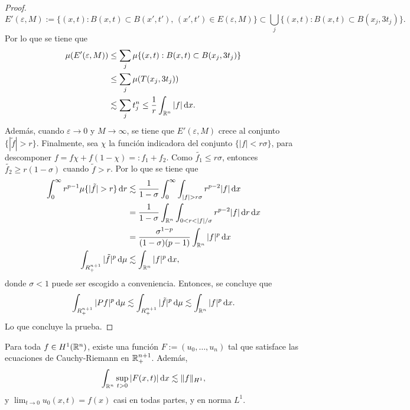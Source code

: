 \begin{proof}
	\begin{equation*}
		E'(\varepsilon, M) := \{(x, t) : B(x, t) \subset B(x', t'), \, (x', t') \in E(\varepsilon, M)\} \subset \bigcup_j \{(x, t): B(x, t)\subset B(x_j, 3t_j)\}.
	\end{equation*}
	Por lo que se tiene que 
	\begin{align*}
		\mu (E'(\varepsilon, M) ) & \leq \sum_j \mu \{(x, t): B(x, t)\subset B(x_j, 3t_j)\} \\
		& \leq \sum_j \mu (T(x_j, 3t_j)) \\
		& \lesssim \sum_j t_j^n 
		 \leq \frac{1}{r} \int_{\mathbb{R}^n} |f|\mathop{}\!\mathrm{d} x.
	\end{align*}
	Además, cuando $\varepsilon\to0$ y $M\to\infty$, se tiene que $E'(\varepsilon, M)$ crece al conjunto $\{|\tilde{f}|>r\} $. Finalmente, sea $\chi$ la función indicadora del conjunto $\{|f|<r\sigma\}$, para descomponer $f=f\chi + f(1-\chi)=:f_1+f_2$. Como $\tilde{f_1} \leq r\sigma$, entonces $\tilde{f_2} \geq r(1-\sigma)$ cuando $\tilde{f}>r$. Por lo que se tiene que
	\begin{align*}
		\int_0^\infty r^{p-1} \mu\{|\tilde{f}|>r\} \diff r & \lesssim \frac{1}{1-\sigma} \int_0^\infty \int_{|f|>r\sigma} r^{p-2} |f| \diff x \\
		& = \frac{1}{1-\sigma}\int_{\R^n}\int_{0<r<|f|/\sigma} r^{p-2}|f|\diff r \diff x \\
		& = \frac{\sigma^{1-p}}{(1-\sigma)(p-1)} \int_{\R^n}|f|^p \diff x \\
		\int_{R^{n+1}_+} |\tilde{f}|^p \diff \mu & \lesssim \int_{\R^n}|f|^p \diff x,
	\end{align*}
	donde $\sigma<1$ puede ser escogido a conveniencia. Entonces, se concluye que 
	\begin{equation*}
		\int_{R^{n+1}_+} |Pf|^p \mathop{}\!\mathrm{d} \mu\lesssim \int_{R^{n+1}_+} |\tilde{f}|^p \mathop{}\!\mathrm{d} \mu \lesssim \int_{\mathbb{R}^n}|f|^p \mathop{}\!\mathrm{d} x.
	\end{equation*}
	Lo que concluye la prueba.
\end{proof}
\begin{theorem}\label{theo:H1-F}
	Para toda $f\in H^1(\mathbb{R}^n)$, existe una función $F:=(u_0, \ldots, u_n)$ tal que satisface las ecuaciones de Cauchy-Riemann en $\mathbb{R}^{n+1}_+$. Además, 
	\begin{equation*}
	\int_{\mathbb{R}^n} \sup_{t>0}  |F(x, t)| \mathop{}\!\mathrm{d} x \lesssim \|f\|_{H^1},
	\end{equation*}
	 y $\lim_{t\to0}u_0(x, t) = f(x)$ casi en todas partes, y  en norma $L^1$.
\end{theorem}
